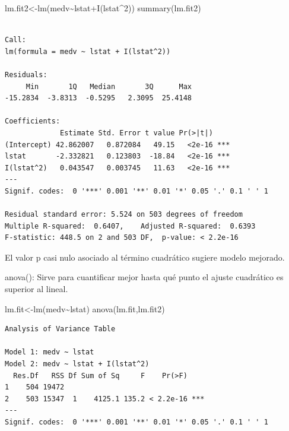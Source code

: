 \documentclass[
  letterpaper,
  DIV=11,
  numbers=noendperiod]{scrartcl}
\newenvironment{Shaded}{\begin{snugshade}}{\end{snugshade}}
\newcommand{\DecValTok}[1]{\textcolor[rgb]{0.68,0.00,0.00}{#1}}
\newcommand{\FunctionTok}[1]{\textcolor[rgb]{0.28,0.35,0.67}{#1}}
\newcommand{\NormalTok}[1]{\textcolor[rgb]{0.00,0.23,0.31}{#1}}
\newcommand{\OtherTok}[1]{\textcolor[rgb]{0.00,0.23,0.31}{#1}}
\newcommand{\SpecialCharTok}[1]{\textcolor[rgb]{0.37,0.37,0.37}{#1}}
\begin{document}
\begin{Shaded}
\begin{Highlighting}[]
\NormalTok{lm.fit2}\OtherTok{\textless{}{-}}\FunctionTok{lm}\NormalTok{(medv}\SpecialCharTok{\textasciitilde{}}\NormalTok{lstat}\SpecialCharTok{+}\FunctionTok{I}\NormalTok{(lstat}\SpecialCharTok{\^{}}\DecValTok{2}\NormalTok{))}
\FunctionTok{summary}\NormalTok{(lm.fit2)}
\end{Highlighting}
\end{Shaded}

\begin{verbatim}

Call:
lm(formula = medv ~ lstat + I(lstat^2))

Residuals:
     Min       1Q   Median       3Q      Max 
-15.2834  -3.8313  -0.5295   2.3095  25.4148 

Coefficients:
             Estimate Std. Error t value Pr(>|t|)    
(Intercept) 42.862007   0.872084   49.15   <2e-16 ***
lstat       -2.332821   0.123803  -18.84   <2e-16 ***
I(lstat^2)   0.043547   0.003745   11.63   <2e-16 ***
---
Signif. codes:  0 '***' 0.001 '**' 0.01 '*' 0.05 '.' 0.1 ' ' 1

Residual standard error: 5.524 on 503 degrees of freedom
Multiple R-squared:  0.6407,    Adjusted R-squared:  0.6393 
F-statistic: 448.5 on 2 and 503 DF,  p-value: < 2.2e-16
\end{verbatim}

El valor p casi nulo asociado al término cuadrático sugiere modelo
mejorado.

anova(): Sirve para cuantificar mejor hasta qué punto el ajuste
cuadrático es superior al lineal.

\begin{Shaded}
\begin{Highlighting}[]
\NormalTok{lm.fit}\OtherTok{\textless{}{-}}\FunctionTok{lm}\NormalTok{(medv}\SpecialCharTok{\textasciitilde{}}\NormalTok{lstat)}
\FunctionTok{anova}\NormalTok{(lm.fit,lm.fit2)}
\end{Highlighting}
\end{Shaded}

\begin{verbatim}
Analysis of Variance Table

Model 1: medv ~ lstat
Model 2: medv ~ lstat + I(lstat^2)
  Res.Df   RSS Df Sum of Sq     F    Pr(>F)    
1    504 19472                                 
2    503 15347  1    4125.1 135.2 < 2.2e-16 ***
---
Signif. codes:  0 '***' 0.001 '**' 0.01 '*' 0.05 '.' 0.1 ' ' 1
\end{verbatim}
\end{document}
